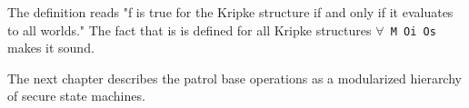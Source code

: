 \documentclass[../../main/main.tex]{subfiles}
\begin{document}
The definition reads "f is true for the Kripke structure if and only if it evaluates to all worlds."  The fact that is is defined for all Kripke structures \texttt{$\forall$ M Oi Os} makes it sound.  

%

%
%
%
%

The next chapter describes the patrol base operations as a modularized hierarchy of secure state machines.
\end{document}

